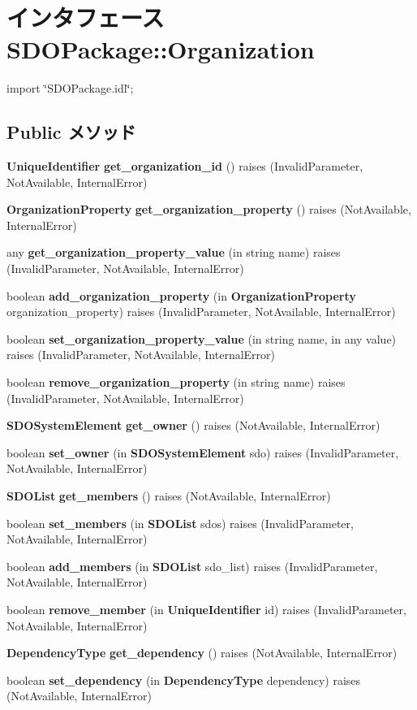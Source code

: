 \section{インタフェース SDOPackage::Organization}
\label{interfaceSDOPackage_1_1Organization}


{\ttfamily import \char`\"{}SDOPackage.idl\char`\"{};}

\subsection*{Public メソッド}
\begin{DoxyCompactItemize}
\item 
{\bf UniqueIdentifier} {\bf get\_\-organization\_\-id} ()  raises (InvalidParameter, NotAvailable, InternalError)
\item 
{\bf OrganizationProperty} {\bf get\_\-organization\_\-property} ()  raises (NotAvailable, InternalError)
\item 
any {\bf get\_\-organization\_\-property\_\-value} (in string name)  raises (InvalidParameter, NotAvailable, InternalError)
\item 
boolean {\bf add\_\-organization\_\-property} (in {\bf OrganizationProperty} organization\_\-property)  raises (InvalidParameter, NotAvailable, InternalError)
\item 
boolean {\bf set\_\-organization\_\-property\_\-value} (in string name, in any value)  raises (InvalidParameter, NotAvailable, InternalError)
\item 
boolean {\bf remove\_\-organization\_\-property} (in string name)  raises (InvalidParameter, NotAvailable, InternalError)
\item 
{\bf SDOSystemElement} {\bf get\_\-owner} ()  raises (NotAvailable, InternalError)
\item 
boolean {\bf set\_\-owner} (in {\bf SDOSystemElement} sdo)  raises (InvalidParameter, NotAvailable, InternalError)
\item 
{\bf SDOList} {\bf get\_\-members} ()  raises (NotAvailable, InternalError)
\item 
boolean {\bf set\_\-members} (in {\bf SDOList} sdos)  raises (InvalidParameter, NotAvailable, InternalError)
\item 
boolean {\bf add\_\-members} (in {\bf SDOList} sdo\_\-list)  raises (InvalidParameter, NotAvailable, InternalError)
\item 
boolean {\bf remove\_\-member} (in {\bf UniqueIdentifier} id)  raises (InvalidParameter, NotAvailable, InternalError)
\item 
{\bf DependencyType} {\bf get\_\-dependency} ()  raises (NotAvailable, InternalError)
\item 
boolean {\bf set\_\-dependency} (in {\bf DependencyType} dependency)  raises (NotAvailable, InternalError)
\end{DoxyCompactItemize}


